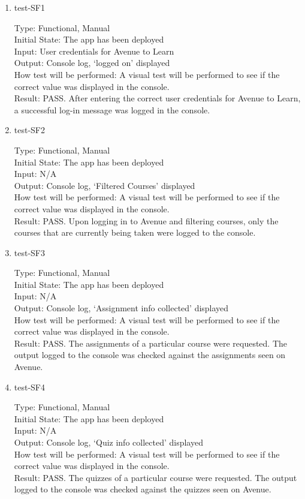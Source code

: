 \documentclass[12pt, titlepage]{article}
\begin{document}
\begin{enumerate}
\item{test-SF1\\}

Type: Functional, Manual\\
Initial State: The app has been deployed\\
Input: User credentials for Avenue to Learn\\
Output: Console log, ‘logged on’ displayed\\
How test will be performed: A visual test will be performed to see if the correct value was displayed in the console.\\
Result: PASS. After entering the correct user credentials for Avenue to Learn, a successful log-in message was logged in the console. 

\item{test-SF2\\}

Type: Functional, Manual\\
Initial State: The app has been deployed\\
Input: N/A\\
Output: Console log, ‘Filtered Courses’ displayed\\
How test will be performed: A visual test will be performed to see if the correct value was displayed in the console.\\
Result: PASS. Upon logging in to Avenue and filtering courses, only the courses that are currently being taken were logged to the console.

\item{test-SF3\\}

Type: Functional, Manual\\
Initial State: The app has been deployed\\
Input: N/A\\
Output: Console log, ‘Assignment info collected’ displayed\\
How test will be performed: A visual test will be performed to see if the correct value was displayed in the console.\\
Result: PASS. The assignments of a particular course were requested. The output logged to the console was checked against the assignments seen on Avenue. 

\item{test-SF4\\}

Type: Functional, Manual\\
Initial State: The app has been deployed\\
Input: N/A\\
Output: Console log, ‘Quiz info collected’ displayed\\
How test will be performed: A visual test will be performed to see if the correct value was displayed in the console.\\
Result: PASS. The quizzes of a particular course were requested. The output logged to the console was checked against the quizzes seen on Avenue. 


\end{enumerate}
\end{document}
